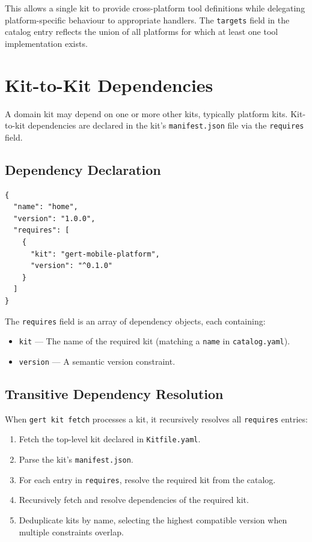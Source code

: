 This allows a single kit to provide cross-platform tool definitions while delegating platform-specific behaviour to appropriate handlers. The \texttt{targets} field in the catalog entry reflects the union of all platforms for which at least one tool implementation exists.

\section{Kit-to-Kit Dependencies}
\label{sec:kit-dependencies}

A domain kit may depend on one or more other kits, typically platform kits. Kit-to-kit dependencies are declared in the kit's \texttt{manifest.json} file via the \texttt{requires} field.

\subsection{Dependency Declaration}

\begin{verbatim}
{
  "name": "home",
  "version": "1.0.0",
  "requires": [
    {
      "kit": "gert-mobile-platform",
      "version": "^0.1.0"
    }
  ]
}
\end{verbatim}

The \texttt{requires} field is an array of dependency objects, each containing:

\begin{itemize}
  \item \texttt{kit} — The name of the required kit (matching a \texttt{name} in \texttt{catalog.yaml}).
  \item \texttt{version} — A semantic version constraint.
\end{itemize}

\subsection{Transitive Dependency Resolution}

When \texttt{gert kit fetch} processes a kit, it recursively resolves all \texttt{requires} entries:

\begin{enumerate}
  \item Fetch the top-level kit declared in \texttt{Kitfile.yaml}.
  \item Parse the kit's \texttt{manifest.json}.
  \item For each entry in \texttt{requires}, resolve the required kit from the catalog.
  \item Recursively fetch and resolve dependencies of the required kit.
  \item Deduplicate kits by name, selecting the highest compatible version when multiple constraints overlap.
\end{enumerate}

